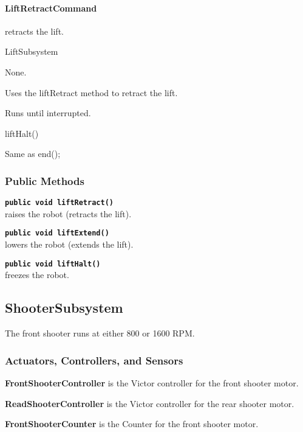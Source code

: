 \documentclass[]{article}
\begin{document}
\paragraph{LiftRetractCommand} retracts the lift.
\begin{description}[topsep=0ex]
\item[requires] LiftSubsystem
\item[initialization]  None.
\item[execute] Uses the liftRetract method to retract the lift.
\item[isDone] Runs until interrupted.
\item[end] liftHalt()
\item[interrupted] Same as end();
\end{description}

\subsubsection{Public Methods}

\noindent \texttt{\textbf{public void liftRetract()}} \\
raises the robot (retracts the lift).

\noindent \texttt{\textbf{public void liftExtend()}} \\
lowers the robot (extends the lift).

\noindent \texttt{\textbf{public void liftHalt()}} \\
freezes the robot.


\subsection{ShooterSubsystem}

The front shooter runs at either 800 or 1600 RPM.

\subsubsection{Actuators, Controllers, and Sensors}

\textbf{FrontShooterController} is the Victor controller for the front shooter motor.

\textbf{ReadShooterController} is the Victor controller for the rear shooter motor.

\textbf{FrontShooterCounter} is the Counter for the front shooter motor.
\end{document}
